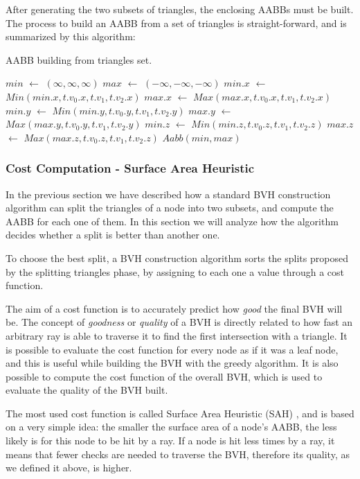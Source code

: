 \documentclass{PoliMi_MasterThesis}
\newcommand*\Let[2]{\State #1 $\gets$ #2}
\begin{document}
After generating the two subsets of triangles, the enclosing AABBs must be built. The process to build an AABB from a set of triangles is straight-forward, and is summarized by this algorithm:
\begin{algorithm}[H]
	\caption{AABB building from triangles set.}
	\begin{algorithmic}[1]
		\Let{$min$}{$(\infty,\infty,\infty)$}
		\Let{$max$}{$(-\infty,-\infty,-\infty)$}
			\Let{$min.x$}{$Min(min.x, t.v_0.x, t.v_1, t.v_2.x)$}
			\Let{$max.x$}{$Max(max.x, t.v_0.x, t.v_1, t.v_2.x)$}
			\Let{$min.y$}{$Min(min.y, t.v_0.y, t.v_1, t.v_2.y)$}
			\Let{$max.y$}{$Max(max.y, t.v_0.y, t.v_1, t.v_2.y)$}
			\Let{$min.z$}{$Min(min.z, t.v_0.z, t.v_1, t.v_2.z)$}
			\Let{$max.z$}{$Max(max.z, t.v_0.z, t.v_1, t.v_2.z)$}
		\EndFor
		\State \Return $Aabb(min, max)$
		\EndFunction
	\end{algorithmic}
	\label{alg:aabb_creation}
\end{algorithm} 

\subsubsection{Cost Computation - Surface Area Heuristic} \label{ssec:cost_computation}
In the previous section we have described how a standard BVH construction algorithm can split the triangles of a node into two subsets, and compute the AABB for each one of them. In this section we will analyze how the algorithm decides whether a split is better than another one.

To choose the best split, a BVH construction algorithm sorts the splits proposed by the splitting triangles phase, by assigning to each one a value through a cost function. 

The aim of a cost function is to accurately predict how \textit{good} the final BVH will be. The concept of \textit{goodness} or \textit{quality} of a BVH is directly related to how fast an arbitrary ray is able to traverse it to find the first intersection with a triangle. It is possible to evaluate the cost function for every node as if it was a leaf node, and this is useful while building the BVH with the greedy algorithm. It is also possible to compute the cost function of the overall BVH, which is used to evaluate the quality of the BVH built.

The most used cost function is called Surface Area Heuristic (SAH) \cite{sah}, and is based on a very simple idea: the smaller the surface area of a node's AABB, the less likely is for this node to be hit by a ray. If a node is hit less times by a ray, it means that fewer checks are needed to traverse the BVH, therefore its quality, as we defined it above, is higher.
\end{document}
